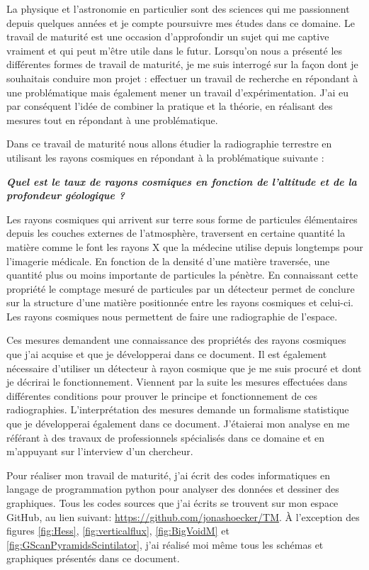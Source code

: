 \documentclass[a4paper, 12pt]{article}
\begin{document}
\begin{spacing}{1.5}
La physique et l'astronomie en particulier sont des sciences qui me passionnent depuis quelques années et je compte poursuivre mes études dans ce domaine. Le travail de maturité est une occasion d'approfondir un sujet qui me captive vraiment et qui peut m'être utile dans le futur. Lorsqu'on nous a présenté les différentes formes de travail de maturité, je me suis interrogé sur la façon dont je souhaitais conduire mon projet : effectuer un travail de recherche en répondant à une problématique mais également mener un travail d'expérimentation. J'ai eu par conséquent l'idée de combiner la pratique et la théorie, en réalisant des mesures tout en répondant à une problématique.

Dans ce travail de maturité nous allons étudier la radiographie terrestre en utilisant les rayons cosmiques en répondant à la problématique suivante : 
\begin{center}
\textbf{\emph{Quel est le taux de rayons cosmiques en fonction de l'altitude et de la profondeur géologique ?}}
\end{center}

Les rayons cosmiques qui arrivent sur terre sous forme de particules élémentaires depuis les couches externes de l'atmosphère, traversent en certaine quantité la matière comme le font les rayons X que la médecine utilise depuis longtemps pour l'imagerie médicale. En fonction de la densité d'une matière traversée, une quantité plus ou moins importante de particules la pénètre. En connaissant cette propriété le comptage mesuré de particules par un détecteur permet de conclure sur la structure d'une matière positionnée entre les rayons cosmiques et celui-ci. Les rayons cosmiques nous permettent de faire une radiographie de l'espace.

Ces mesures demandent une connaissance des propriétés des rayons cosmiques que j'ai acquise et que je développerai dans ce document. Il est également nécessaire d'utiliser un détecteur à rayon cosmique que je me suis procuré et dont je décrirai le fonctionnement. Viennent par la suite les mesures effectuées dans différentes conditions pour prouver le principe et fonctionnement de ces radiographies. L'interprétation des mesures demande un formalisme statistique que je développerai également dans ce document. J'étaierai mon analyse en me référant à des travaux de professionnels spécialisés dans ce domaine et en m'appuyant sur l'interview d'un chercheur.

Pour réaliser mon travail de maturité, j'ai écrit des codes informatiques en langage de programmation python pour analyser des données et dessiner des graphiques. Tous les codes sources que j'ai écrits se trouvent sur mon espace GitHub, au lien suivant: \url{https://github.com/jonashoecker/TM}. À l'exception des figures \ref{fig:Hess}, \ref{fig:verticalflux}, \ref{fig:BigVoidM} et \ref{fig:GScanPyramidsScintilator}, j'ai réalisé moi même tous les schémas et graphiques présentés dans ce document.



\end{spacing}
\end{document}
